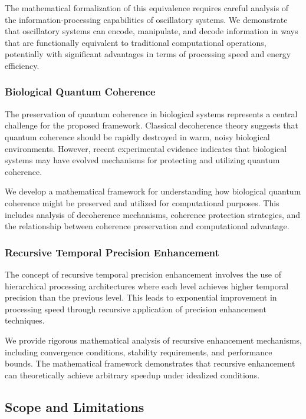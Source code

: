 \documentclass[12pt,a4paper]{article}
\theoremstyle{definition}
\begin{document}
The mathematical formalization of this equivalence requires careful analysis of the information-processing capabilities of oscillatory systems. We demonstrate that oscillatory systems can encode, manipulate, and decode information in ways that are functionally equivalent to traditional computational operations, potentially with significant advantages in terms of processing speed and energy efficiency.

\subsubsection{Biological Quantum Coherence}

The preservation of quantum coherence in biological systems represents a central challenge for the proposed framework. Classical decoherence theory suggests that quantum coherence should be rapidly destroyed in warm, noisy biological environments. However, recent experimental evidence indicates that biological systems may have evolved mechanisms for protecting and utilizing quantum coherence.

We develop a mathematical framework for understanding how biological quantum coherence might be preserved and utilized for computational purposes. This includes analysis of decoherence mechanisms, coherence protection strategies, and the relationship between coherence preservation and computational advantage.

\subsubsection{Recursive Temporal Precision Enhancement}

The concept of recursive temporal precision enhancement involves the use of hierarchical processing architectures where each level achieves higher temporal precision than the previous level. This leads to exponential improvement in processing speed through recursive application of precision enhancement techniques.

We provide rigorous mathematical analysis of recursive enhancement mechanisms, including convergence conditions, stability requirements, and performance bounds. The mathematical framework demonstrates that recursive enhancement can theoretically achieve arbitrary speedup under idealized conditions.

\subsection{Scope and Limitations}
\end{document}
